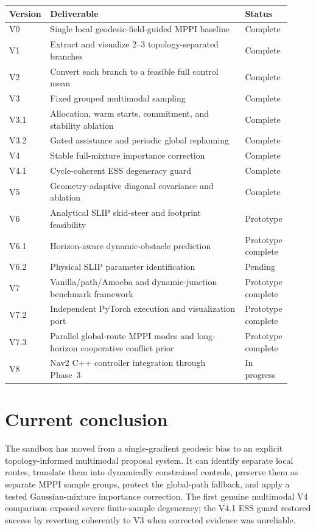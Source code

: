 \documentclass[11pt,a4paper]{article}
\begin{document}
\begin{tabular}{p{0.10\linewidth}p{0.68\linewidth}p{0.14\linewidth}}
\toprule
\textbf{Version} & \textbf{Deliverable} & \textbf{Status} \\
\midrule
V0 & Single local geodesic-field-guided MPPI baseline & Complete \\
V1 & Extract and visualize 2--3 topology-separated branches & Complete \\
V2 & Convert each branch to a feasible full control mean & Complete \\
V3 & Fixed grouped multimodal sampling & Complete \\
V3.1 & Allocation, warm starts, commitment, and stability ablation & Complete \\
V3.2 & Gated assistance and periodic global replanning & Complete \\
V4 & Stable full-mixture importance correction & Complete \\
V4.1 & Cycle-coherent ESS degeneracy guard & Complete \\
V5 & Geometry-adaptive diagonal covariance and ablation & Complete \\
V6 & Analytical SLIP skid-steer and footprint feasibility & Prototype \\
V6.1 & Horizon-aware dynamic-obstacle prediction & Prototype complete \\
V6.2 & Physical SLIP parameter identification & Pending \\
V7 & Vanilla/path/Amoeba and dynamic-junction benchmark framework & Prototype complete \\
V7.2 & Independent PyTorch execution and visualization port & Prototype complete \\
V7.3 & Parallel global-route MPPI modes and long-horizon cooperative conflict prior & Prototype complete \\
V8 & Nav2 C++ controller integration through Phase~3 & In progress \\
\bottomrule
\end{tabular}

\section{Current conclusion}

The sandbox has moved from a single-gradient geodesic bias to an explicit
topology-informed multimodal proposal system. It can identify separate local
routes, translate them into dynamically constrained controls, preserve them as
separate MPPI sample groups, protect the global-path fallback, and apply a
tested Gaussian-mixture importance correction. The first genuine multimodal
V4 comparison exposed severe finite-sample degeneracy; the V4.1 ESS guard
restored success by reverting coherently to V3 when corrected evidence was
unreliable.
\end{document}

